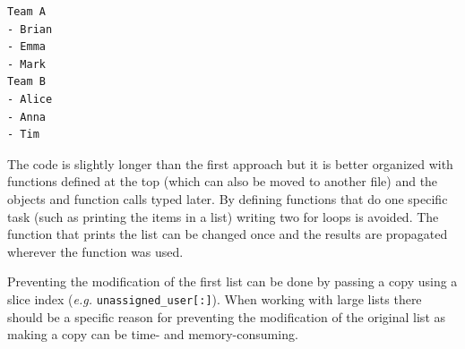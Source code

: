 \documentclass[10pt]{book}
\begin{document}
\label{orgf5fe620}
\begin{verbatim}
Team A
- Brian
- Emma
- Mark
Team B
- Alice
- Anna
- Tim
\end{verbatim}

The code is slightly longer than the first approach but it is better organized  with functions defined at the top (which can also be moved to another file) and the objects and function calls typed later. By defining functions that do one specific task (such as printing the items in a list) writing two for loops is avoided. The function that prints the list can be changed once and the results are propagated wherever the function was used.

Preventing the modification of the first list can be done by passing a copy using a slice index (\emph{e.g.} \texttt{unassigned\_user[:]}). When working with large lists there should be a specific reason for preventing the modification of the original list as making a copy can be time- and memory-consuming.
\end{document}
